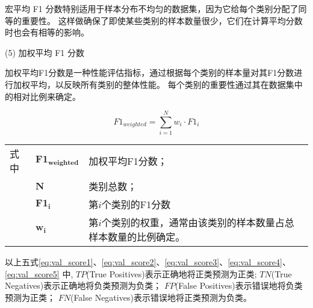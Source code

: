 宏平均 F1 分数特别适用于样本分布不均匀的数据集，因为它给每个类别分配了同等的重要性。
这样做确保了即使某些类别的样本数量很少，它们在计算平均分数时也会有相等的影响。

(5) 加权平均 F1 分数\par
加权平均F1分数是一种性能评估指标，通过根据每个类别的样本量对其F1分数进行加权平均，以反映所有类别的整体性能。
每个类别的重要性通过其在数据集中的相对比例来确定。

\begin{equation}
  \label{eq:val_score5}
  F1_{weighted} = \sum\limits_{i=1}^{N} w_i \cdot F1_i
\end{equation}
\begin{flushleft}
  \renewcommand\arraystretch{1.25}
  \begin{tabularx}{\textwidth}{@{}>{\normalsize\rm}l@{\quad}>{\normalsize\rm}l@{——}>{\normalsize\rm}X@{}}
  式中& $\symbf{F1_{weighted}}$ &加权平均F1分数；\\
  &  $\symbf{N}$&类别总数；\\
  &  $\symbf{F1_i}$ &第$i$个类别的F1分数\\
  &  $\symbf{w_i}$ & 第$i$个类别的权重，通常由该类别的样本数量占总样本数量的比例确定。\\
  \end{tabularx}\vspace{.5ex}%
  \end{flushleft}



以上五式\ref{eq:val_score1}、\ref{eq:val_score2}、\ref{eq:val_score3}、\ref{eq:val_score4}、\ref{eq:val_score5}%
中,
  $TP$(True Positives)表示正确地将正类预测为正类;
  $TN$(True Negatives)表示正确地将负类预测为负类；
  $FP$(False Positives)表示错误地将负类预测为正类；
  $FN$(False Negatives)表示错误地将正类预测为负类。

